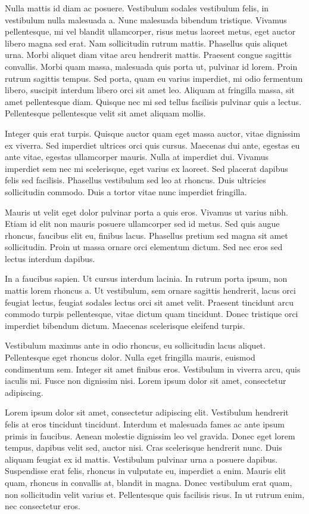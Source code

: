 Nulla mattis id diam ac posuere. Vestibulum sodales vestibulum felis, in vestibulum nulla malesuada a. Nunc malesuada bibendum tristique. Vivamus pellentesque, mi vel blandit ullamcorper, risus metus laoreet metus, eget auctor libero magna sed erat. Nam sollicitudin rutrum mattis. Phasellus quis aliquet urna. Morbi aliquet diam vitae arcu hendrerit mattis. Praesent congue sagittis convallis. Morbi quam massa, malesuada quis porta ut, pulvinar id lorem. Proin rutrum sagittis tempus. Sed porta, quam eu varius imperdiet, mi odio fermentum libero, suscipit interdum libero orci sit amet leo. Aliquam at fringilla massa, sit amet pellentesque diam. Quisque nec mi sed tellus facilisis pulvinar quis a lectus. Pellentesque pellentesque velit sit amet aliquam mollis.

Integer quis erat turpis. Quisque auctor quam eget massa auctor, vitae dignissim ex viverra. Sed imperdiet ultrices orci quis cursus. Maecenas dui ante, egestas eu ante vitae, egestas ullamcorper mauris. Nulla at imperdiet dui. Vivamus imperdiet sem nec mi scelerisque, eget varius ex laoreet. Sed placerat dapibus felis sed facilisis. Phasellus vestibulum sed leo at rhoncus. Duis ultricies sollicitudin commodo. Duis a tortor vitae nunc imperdiet fringilla.

Mauris ut velit eget dolor pulvinar porta a quis eros. Vivamus ut varius nibh. Etiam id elit non mauris posuere ullamcorper sed id metus. Sed quis augue rhoncus, faucibus elit eu, finibus lacus. Phasellus pretium sed magna sit amet sollicitudin. Proin ut massa ornare orci elementum dictum. Sed nec eros sed lectus interdum dapibus.

In a faucibus sapien. Ut cursus interdum lacinia. In rutrum porta ipsum, non mattis lorem rhoncus a. Ut vestibulum, sem ornare sagittis hendrerit, lacus orci feugiat lectus, feugiat sodales lectus orci sit amet velit. Praesent tincidunt arcu commodo turpis pellentesque, vitae dictum quam tincidunt. Donec tristique orci imperdiet bibendum dictum. Maecenas scelerisque eleifend turpis.

Vestibulum maximus ante in odio rhoncus, eu sollicitudin lacus aliquet. Pellentesque eget rhoncus dolor. Nulla eget fringilla mauris, euismod condimentum sem. Integer sit amet finibus eros. Vestibulum in viverra arcu, quis iaculis mi. Fusce non dignissim nisi. Lorem ipsum dolor sit amet, consectetur adipiscing. 



Lorem ipsum dolor sit amet, consectetur adipiscing elit. Vestibulum hendrerit felis at eros tincidunt tincidunt. Interdum et malesuada fames ac ante ipsum primis in faucibus. Aenean molestie dignissim leo vel gravida. Donec eget lorem tempus, dapibus velit sed, auctor nisi. Cras scelerisque hendrerit nunc. Duis aliquam feugiat ex id mattis. Vestibulum pulvinar urna a posuere dapibus. Suspendisse erat felis, rhoncus in vulputate eu, imperdiet a enim. Mauris elit quam, rhoncus in convallis at, blandit in magna. Donec vestibulum erat quam, non sollicitudin velit varius et. Pellentesque quis facilisis risus. In ut rutrum enim, nec consectetur eros.


